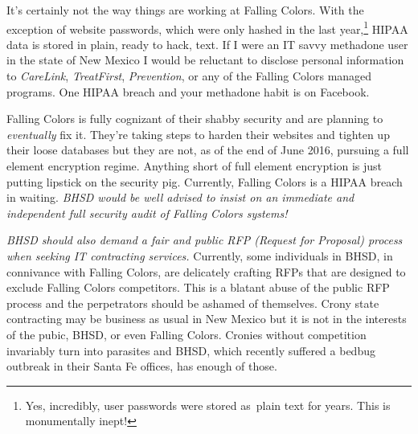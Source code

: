 It's certainly not the way things are working at Falling Colors. With
the exception of website passwords, which were only hashed in the last
year,\footnote{ Yes, incredibly, user passwords were stored as~plain text for years.
This is monumentally inept!
} HIPAA data is stored
in plain, ready to hack, text. If I were an IT savvy methadone user in
the state of New Mexico I would be reluctant to disclose personal
information to \emph{CareLink}, \emph{TreatFirst}, \emph{Prevention}, or
any of the Falling Colors managed programs. One HIPAA breach and your
methadone habit is on Facebook.

Falling Colors is fully cognizant of their shabby security and are
planning to \emph{eventually} fix it. They're taking steps to harden
their websites and tighten up their loose databases but they are not, as
of the end of June 2016, pursuing a full element encryption regime.
Anything short of full element encryption is just putting lipstick on
the security pig. Currently, Falling Colors is a HIPAA breach in
waiting. \emph{BHSD would be well advised to insist on an immediate and
independent full security audit of Falling Colors systems!}

\emph{BHSD should also demand a fair and public RFP (Request for
Proposal) process when seeking IT contracting services.} Currently, some
individuals in BHSD, in connivance with Falling Colors, are delicately
crafting RFPs that are designed to exclude Falling Colors competitors.
This is a blatant abuse of the public RFP process and the perpetrators
should be ashamed of themselves. Crony state contracting may be business
as usual in New Mexico but it is not in the interests of the pubic,
BHSD, or even Falling Colors. Cronies without competition invariably
turn into parasites and BHSD, which recently suffered a bedbug outbreak
in their Santa Fe offices, has enough of those.
%
%
%
%
%
%



%